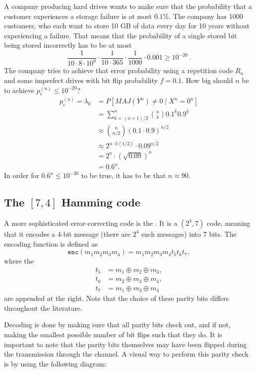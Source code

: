 \begin{example}
A company producing hard drives wants to make sure that the probability that a customer experiences a storage failure is at most $0.1\%$. The company has 1000 customers, who each want to store 10 GB of data every day for 10 years without experiencing a failure. That means that the probability of a single stored bit being stored incorrectly has to be at most
\[
\frac{1}{10 \cdot 8 \cdot 10^9} \cdot \frac{1}{10 \cdot 365} \cdot \frac{1}{1000} \cdot 0.001 \geq 10^{-20} \, .
\]
The company tries to achieve that error probability using a repetition code $R_n$ and some imperfect drives with bit flip probability $f = 0.1$. How big should $n$ be to achieve $p_e^{(n)} \leq 10^{-20}$?
\begin{align*}
p_e^{(n)} = \lambda_0 &= P[MAJ(Y^n) \neq 0 \mid X^n = 0^n]\\
&= \sum_{k = (n+1)/2}^n {n \choose k} 0.1^k 0.9^k\\
&\approx {n \choose n/2} \left(0.1\cdot 0.9\right)^{n/2}\\
&\approx 2^{n\cdot h(1/2)} \cdot 0.09^{n/2}\\
&= 2^n \cdot \left(\sqrt{0.09}\right)^n\\
&= 0.6^n.
\end{align*}
In order for $0.6^n \leq 10^{-20}$ to be true, it has to be that $n \approx 90$.
\end{example}




\subsection{The $[7,4]$ Hamming code}
A more sophisticated error-correcting code is the . It is a $(2^4,7)$ code, meaning that it encodes a 4-bit message (there are $2^4$ such messages) into 7 bits. The encoding function is defined as
\[
\mathtt{enc}(m_1m_2m_3m_4) = m_1m_2m_3m_4t_5t_6t_7,
\]
where the 
\begin{align*}
t_5 &= m_1 \oplus m_2 \oplus m_3,\\
t_6 &= m_2 \oplus m_3 \oplus m_4,\\
t_7 &= m_1 \oplus m_3 \oplus m_4
\end{align*}
are appended at the right. Note that the choice of these parity bits differs throughout the literature.

Decoding is done by making sure that all parity bits check out, and if not, making the smallest possible number of bit flips such that they do. It is important to note that the parity bits themselves may have been flipped during the transmission through the channel. A visual way to perform this parity check is by using the following diagram:


